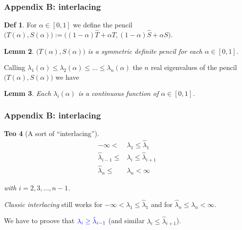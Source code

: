 \documentclass{beamer}
\theoremstyle{definition} \newtheorem{de}{Def}
\theoremstyle{remark} \newtheorem{os}[de]{Remark}
\theoremstyle{plain} \newtheorem{te}[de]{Teo}
\theoremstyle{plain} \newtheorem{co}[de]{Cor}
\theoremstyle{plain} \newtheorem{pr}[de]{Prop}
\theoremstyle{plain} \newtheorem{lem}[de]{Lemm}
\theoremstyle{remark} \newtheorem{rem}[de]{Remark}
\begin{document}
\begin{frame}[label=Interlacing]
  \frametitle{Appendix B: interlacing}

  \begin{de}
    For $\alpha\in[0,1]$ we define the pencil $\big( T(\alpha), S(\alpha) \big) := \big( (1-\alpha)\hat T + \alpha T, (1-\alpha)\hat S + \alpha S \big)$.
  \end{de}

  \begin{lem}
    $\big( T(\alpha), S(\alpha) \big)$ is a \emph{symmetric definite} pencil for each $\alpha\in[0,1]$.
  \end{lem}

  Calling $\lambda_1(\alpha)\le \lambda_2(\alpha)\le \dots \le \lambda_n(\alpha)$ the $n$ real eigenvalues of the pencil  $\big( T(\alpha), S(\alpha) \big)$ we have

  \begin{lem}
    Each $\lambda_i(\alpha)$ is a continuous function of $\alpha\in[0,1]$.
  \end{lem}

\end{frame}

\begin{frame}
  \frametitle{Appendix B: interlacing}

  \begin{te}[A sort of ``interlacing'']
    \begin{align*}
      -\infty < &\lambda_1 \le \hat\lambda_1 \\
      \hat\lambda_{i-1} \le &\lambda_i \le \hat\lambda_{i+1} \\
      \hat\lambda_n \le &\lambda_n < \infty
    \end{align*}

    with $i=2,3,\dots,n-1$.
  \end{te}

  \pause


  \emph{Classic interlacing} still works for $-\infty < \lambda_1 \le \hat\lambda_1$ and for $\hat\lambda_n \le \lambda_n < \infty$.

  \pause

  We have to proove that $\textcolor{blue}{\lambda_i \ge \hat\lambda_{i-1}}$ (and similar $\lambda_i \le \hat\lambda_{i+1}$).

\end{frame}
\end{document}
